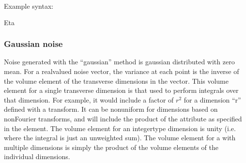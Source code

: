 \documentclass[letterpaper,10pt,english]{sphinxmanual}
\begin{document}
\sphinxAtStartPar
Example syntax:

\begin{sphinxVerbatim}[commandchars=\\\{\}]
 
          
      Eta
\end{sphinxVerbatim}

\ignorespaces 

\subsubsection{Gaussian noise}
\label{\detokenize{reference_elements:gaussian-noise}}\label{\detokenize{reference_elements:gaussiannoise}}\label{\detokenize{reference_elements:index-60}}
\sphinxAtStartPar
Noise generated with the “gaussian” method is gaussian distributed with zero mean.  For a real\sphinxhyphen{}valued noise vector, the variance at each point is the inverse of the volume element of the transverse dimensions in the vector.  This volume element for a single transverse dimension is that used to perform integrals over that dimension.  For example, it would include a factor of \(r^2\) for a dimension “r” defined with a  transform.  It can be non\sphinxhyphen{}uniform for dimensions based on non\sphinxhyphen{}Fourier transforms, and will include the product of the  attribute as specified in the {\hyperref[\detokenize{reference_elements:geometryelement}]{}} element.  The volume element for an integer\sphinxhyphen{}type dimension is unity (i.e. where the integral is just an unweighted sum).  The volume element for a  with multiple dimensions is simply the product of the volume elements of the individual dimensions.
\end{document}
